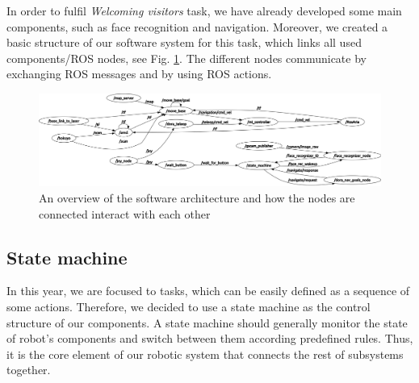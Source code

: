 \documentclass[conference]{IEEEtran}
\begin{document}
In order to fulfil \textit{Welcoming visitors} task, we have already developed some main components, such as face recognition and navigation. Moreover, we created a basic structure of our software system for this task, which links all used components/ROS nodes, see Fig. \ref{fig:nodes}. The different nodes communicate by exchanging ROS messages and by using ROS actions. 

\begin{figure}[!t]
\centering
\includegraphics[width=\textwidth]{nodes_cut.png}
\caption{An overview of the software architecture and how the nodes are connected interact with each other}
\label{fig:nodes}
\end{figure}

\subsection{State machine}
In this year, we are focused to tasks, which can be easily defined as a sequence of some actions. Therefore, we decided to use a state machine as the control structure of our components. A state machine should generally monitor the state of robot's components and switch between them according predefined rules. Thus, it is the core element of our robotic system that connects the rest of subsystems together.
\end{document}
